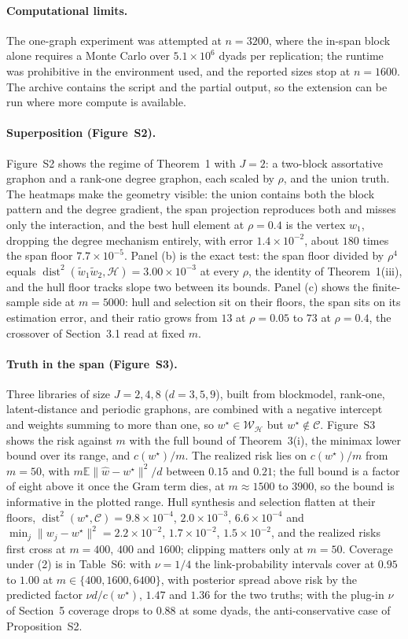 \documentclass[12pt]{article}
\newcommand{\E}{\mathbb{E}}
\newcommand{\calH}{\mathcal{H}}
\newcommand{\calC}{\mathcal{C}}
\newcommand{\calW}{\mathcal{W}}
\newcommand{\dist}{\operatorname{dist}}
\newcommand{\norm}[1]{\|#1\|}
\newcommand{\wstar}{w^{\star}}
\newcommand{\what}{\hat w}
\begin{document}
\paragraph{Computational limits.}
The one-graph experiment was attempted at $n=3200$, where the in-span block alone requires a Monte Carlo over $5.1\times10^{6}$ dyads per replication; the runtime was prohibitive in the environment used, and the reported sizes stop at $n=1600$. The archive contains the script and the partial output, so the extension can be run where more compute is available.

\paragraph{Superposition (Figure~S2).}
Figure~S2 shows the regime of Theorem~1 with $J=2$: a two-block assortative graphon and a rank-one degree graphon, each scaled by $\rho$, and the union truth. The heatmaps make the geometry visible: the union contains both the block pattern and the degree gradient, the span projection reproduces both and misses only the interaction, and the best hull element at $\rho=0.4$ is the vertex $w_1$, dropping the degree mechanism entirely, with error $1.4\times10^{-2}$, about $180$ times the span floor $7.7\times10^{-5}$. Panel (b) is the exact test: the span floor divided by $\rho^4$ equals $\dist^2(\tilde w_1\tilde w_2,\calH)=3.00\times10^{-3}$ at every $\rho$, the identity of Theorem~1(iii), and the hull floor tracks slope two between its bounds. Panel (c) shows the finite-sample side at $m=5000$: hull and selection sit on their floors, the span sits on its estimation error, and their ratio grows from $13$ at $\rho=0.05$ to $73$ at $\rho=0.4$, the crossover of Section~3.1 read at fixed $m$.

\paragraph{Truth in the span (Figure~S3).}
Three libraries of size $J=2,4,8$ ($d=3,5,9$), built from blockmodel, rank-one, latent-distance and periodic graphons, are combined with a negative intercept and weights summing to more than one, so $\wstar\in\calW_{\calH}$ but $\wstar\notin\calC$. Figure~S3 shows the risk against $m$ with the full bound of Theorem~3(i), the minimax lower bound over its range, and $c(\wstar)/m$. The realized risk lies on $c(\wstar)/m$ from $m=50$, with $m\E\norm{\what-\wstar}^2/d$ between $0.15$ and $0.21$; the full bound is a factor of eight above it once the Gram term dies, at $m\approx1500$ to $3900$, so the bound is informative in the plotted range. Hull synthesis and selection flatten at their floors, $\dist^2(\wstar,\calC)=9.8\times10^{-4}$, $2.0\times10^{-3}$, $6.6\times10^{-4}$ and $\min_j\norm{w_j-\wstar}^2=2.2\times10^{-2}$, $1.7\times10^{-2}$, $1.5\times10^{-2}$, and the realized risks first cross at $m=400$, $400$ and $1600$; clipping matters only at $m=50$. Coverage under (2) is in Table~S6: with $\nu=1/4$ the link-probability intervals cover at $0.95$ to $1.00$ at $m\in\{400,1600,6400\}$, with posterior spread above risk by the predicted factor $\nu d/c(\wstar)$, $1.47$ and $1.36$ for the two truths; with the plug-in $\nu$ of Section~5 coverage drops to $0.88$ at some dyads, the anti-conservative case of Proposition~S2.
\end{document}
